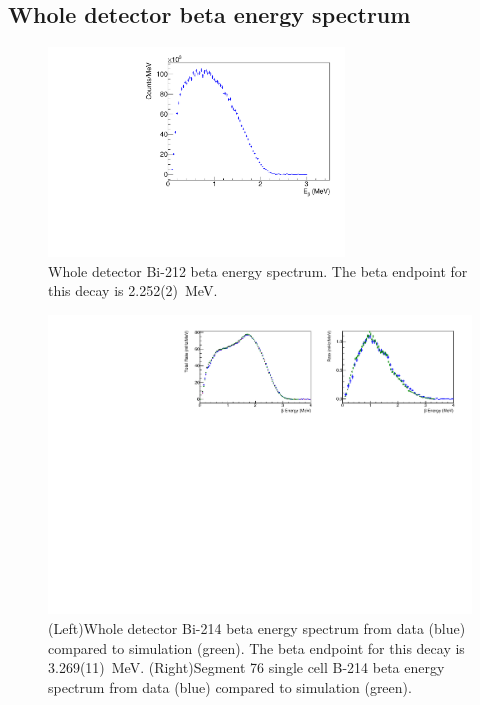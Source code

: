 \subsection{Whole detector beta energy spectrum}
\begin{figure}[!h]
\centering
\includegraphics[width=0.7\textwidth]{figures/PubBiPo212BetaE.pdf}
\caption{\label{fig:BetaE212}Whole detector Bi-212 beta energy spectrum. The beta endpoint for this decay is 2.252(2)~MeV.}
\end{figure}
\begin{figure}[!h]
\centering
\includegraphics[width=1.0\textwidth]{figures/PubBi214BetaEsimCompare.pdf}
\caption{\label{fig:BetaE214}(Left)Whole detector Bi-214 beta energy spectrum from data (blue) compared to simulation (green). The beta endpoint for this decay is 3.269(11)~MeV. (Right)Segment 76 single cell B-214 beta energy spectrum from data (blue) compared to simulation (green).}
\end{figure}

\clearpage
\newpage
